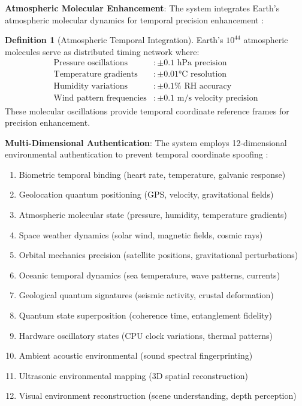 \documentclass[12pt,a4paper]{article}
\theoremstyle{definition}
\newtheorem{definition}{Definition}[section]
\begin{document}
{\textbf{Atmospheric Molecular Enhancement}: The system integrates Earth's atmospheric molecular dynamics for temporal precision enhancement \cite{sachikonye2024atmospheric}:

\begin{definition}[Atmospheric Temporal Integration]
Earth's $10^{44}$ atmospheric molecules serve as distributed timing network where:
\begin{align}
\text{Pressure oscillations} &: \pm 0.1 \text{ hPa precision} \\
\text{Temperature gradients} &: \pm 0.01°\text{C resolution} \\
\text{Humidity variations} &: \pm 0.1\% \text{ RH accuracy} \\
\text{Wind pattern frequencies} &: \pm 0.1 \text{ m/s velocity precision}
\end{align}
These molecular oscillations provide temporal coordinate reference frames for precision enhancement.
\end{definition}

\textbf{Multi-Dimensional Authentication}: The system employs 12-dimensional environmental authentication to prevent temporal coordinate spoofing \cite{sachikonye2024authentication}:

\begin{enumerate}
\item Biometric temporal binding (heart rate, temperature, galvanic response)
\item Geolocation quantum positioning (GPS, velocity, gravitational fields)
\item Atmospheric molecular state (pressure, humidity, temperature gradients)
\item Space weather dynamics (solar wind, magnetic fields, cosmic rays)
\item Orbital mechanics precision (satellite positions, gravitational perturbations)
\item Oceanic temporal dynamics (sea temperature, wave patterns, currents)
\item Geological quantum signatures (seismic activity, crustal deformation)
\item Quantum state superposition (coherence time, entanglement fidelity)
\item Hardware oscillatory states (CPU clock variations, thermal patterns)
\item Ambient acoustic environmental (sound spectral fingerprinting)
\item Ultrasonic environmental mapping (3D spatial reconstruction)
\item Visual environment reconstruction (scene understanding, depth perception)
\end{enumerate}

}
\end{document}
